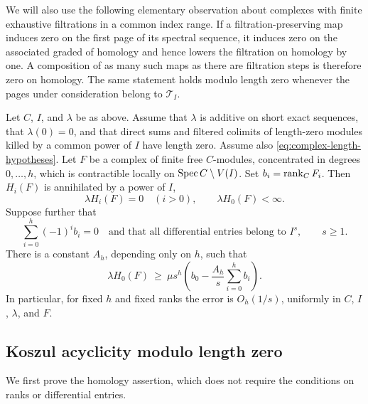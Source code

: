 We will also use the following elementary observation about complexes
with finite exhaustive filtrations in a common index range. If a
filtration-preserving map induces zero on the first page of its spectral
sequence, it induces zero on the associated graded of homology and hence
lowers the filtration on homology by one. A composition of as many such
maps as there are filtration steps is therefore zero on homology. The same
statement holds modulo length zero whenever the pages under consideration
belong to $\mathscr T_I$.

\begin{theorem}\label{thm:complex}
Let $C$, $I$, and $\lambda$ be as above. Assume that $\lambda$ is additive
on short exact sequences, that $\lambda(0)=0$, and that direct sums and
filtered colimits of length-zero modules killed by a common power of $I$
have length zero. Assume also \eqref{eq:complex-length-hypotheses}.
Let $F$ be a complex of finite
free $C$-modules, concentrated in degrees $0,\ldots,h$, which is
contractible locally on $\operatorname{Spec} C\setminus V(I)$. Set
$b_i=\operatorname{rank}_C F_i$. Then $H_i(F)$ is annihilated by a power of $I$,
\[
 \lambda H_i(F)=0\quad(i>0),\qquad \lambda H_0(F)<\infty.
\]
Suppose further that
\[
 \sum_{i=0}^h(-1)^i b_i=0
 \quad\text{and that all differential entries belong to }I^s,
 \qquad s\geq1.
\]
There is a constant $A_h$, depending only on $h$, such that
\begin{equation}\label{eq:complex-estimate}
 \lambda H_0(F)\ \geq\
 \mu s^h\left(b_0-\frac{A_h}{s}\sum_{i=0}^h b_i\right).
\end{equation}
In particular, for fixed $h$ and fixed ranks the error is $O_h(1/s)$,
uniformly in $C$, $I$, $\lambda$, and $F$.
\end{theorem}

\subsection{Koszul acyclicity modulo length zero}

We first prove the homology assertion, which does not require the
conditions on ranks or differential entries.

